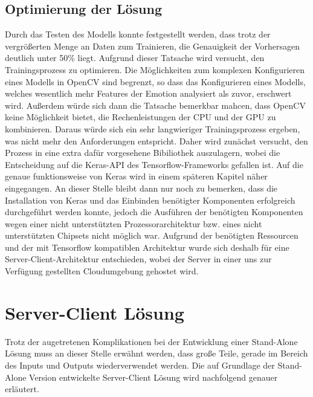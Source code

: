 \documentclass[12pt, a4paper]{scrbook}
\begin{document}
\subsection{Optimierung der Lösung}
Durch das Testen des Modells konnte festgestellt werden, dass trotz der vergrößerten Menge an Daten zum Trainieren, die Genauigkeit der Vorhersagen deutlich unter 50\% liegt. Aufgrund dieser Tatsache wird versucht, den Trainingsprozess zu optimieren. Die Möglichkeiten zum komplexen Konfigurieren eines Modells in OpenCV sind begrenzt, so dass das Konfigurieren eines Modells, welches wesentlich mehr Features der Emotion analysiert als zuvor, erschwert wird. Außerdem würde sich dann die Tatsache bemerkbar mahcen, dass OpenCV keine Möglichkeit bietet, die  Rechenleistungen der CPU und der GPU zu kombinieren. Daraus würde sich ein sehr langwieriger Trainingsprozess ergeben, was nicht mehr den Anforderungen entspricht. Daher wird zunächst versucht, den Prozess in eine extra dafür vorgesehene Bibiliothek auszulagern, wobei die Entscheidung auf die Keras-API des Tensorflow-Frameworks gefallen ist. Auf die genaue funktionsweise von Keras wird in einem späteren Kapitel näher eingegangen. An dieser Stelle bleibt dann nur noch zu bemerken, dass die Installation von Keras und das Einbinden benötigter Komponenten erfolgreich durchgeführt werden konnte, jedoch die Ausführen der benötigten Komponenten wegen einer nicht unterstützten Prozessorarchitektur bzw. eines nicht unterstützten Chipsets nicht möglich war. Aufgrund der benötigten Ressourcen und der mit Tensorflow kompatiblen Architektur wurde sich deshalb für eine Server-Client-Architektur entschieden, wobei der Server in einer uns zur Verfügung gestellten Cloudumgebung gehostet wird.

\section{Server-Client Lösung}
Trotz der augetretenen Komplikationen bei der Entwicklung einer Stand-Alone Lösung muss an dieser Stelle erwähnt werden, dass große Teile, gerade im Bereich des Inputs und Outputs wiederverwendet werden. Die auf Grundlage der Stand-Alone Version entwickelte Server-Client Lösung wird nachfolgend genauer erläutert.
\end{document}
